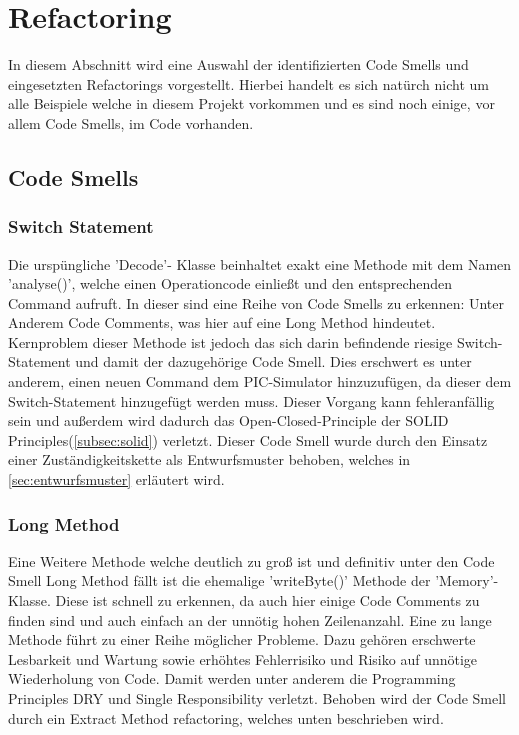 \documentclass[12pt,a4paper,titlepage,ngerman,pdftex]{report}
\begin{document}
    \section{Refactoring}\label{sec:refactoring}


    In diesem Abschnitt wird eine Auswahl der identifizierten Code Smells und eingesetzten Refactorings vorgestellt. Hierbei handelt es sich natürch nicht um alle Beispiele welche in diesem Projekt vorkommen und es sind noch einige, vor allem Code Smells, im Code vorhanden. 

    \subsection{Code Smells}

    \subsubsection{Switch Statement}

    Die urspüngliche 'Decode'- Klasse beinhaltet exakt eine Methode mit dem Namen 'analyse()', welche einen Operationcode einließt und den entsprechenden Command aufruft. In dieser sind eine Reihe von Code Smells zu erkennen: Unter Anderem Code Comments, was hier auf eine Long Method hindeutet.
    Kernproblem dieser Methode ist jedoch das sich darin befindende riesige Switch-Statement und damit der dazugehörige Code Smell. Dies erschwert es unter anderem, einen neuen Command dem PIC-Simulator hinzuzufügen,
    da dieser dem Switch-Statement hinzugefügt werden muss. Dieser Vorgang kann fehleranfällig sein und außerdem wird dadurch das Open-Closed-Principle der SOLID Principles(\autoref{subsec:solid}) verletzt. 
    Dieser Code Smell wurde durch den Einsatz einer Zuständigkeitskette als Entwurfsmuster behoben, welches in \autoref{sec:entwurfsmuster} erläutert wird.

    \subsubsection{Long Method}

    Eine Weitere Methode welche deutlich zu groß ist und definitiv unter den Code Smell Long Method fällt ist die ehemalige 'writeByte()' Methode der 'Memory'- Klasse. Diese ist schnell zu erkennen, da auch hier einige Code Comments zu finden sind und auch einfach an der unnötig hohen Zeilenanzahl.
    Eine zu lange Methode führt zu einer Reihe möglicher Probleme. Dazu gehören erschwerte Lesbarkeit und Wartung sowie erhöhtes Fehlerrisiko und Risiko auf unnötige Wiederholung von Code. Damit werden unter anderem die Programming Principles DRY und Single Responsibility verletzt. 
    Behoben wird der Code Smell durch ein Extract Method refactoring, welches unten beschrieben wird.
    
\end{document}
